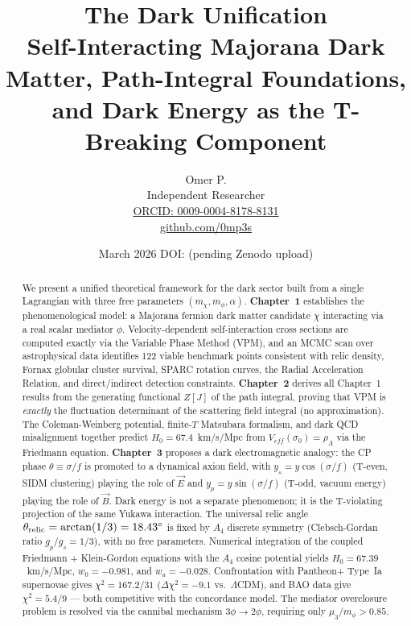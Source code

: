 \documentclass[12pt,a4paper]{article}
\newcommand{\thetarel}{\theta_{\rm relic}}
\begin{document}
\title{\textbf{The Dark Unification}\\[0.5em]
\large Self-Interacting Majorana Dark Matter, Path-Integral Foundations,\\
and Dark Energy as the T-Breaking Component}

\author{Omer P.\\[0.3em]
\small Independent Researcher\\
\small \href{https://orcid.org/0009-0004-8178-8131}{ORCID: 0009-0004-8178-8131}\\
\small \href{https://github.com/0mp3s}{github.com/0mp3s}}

\date{March 2026 \quad\quad DOI: (pending Zenodo upload)}

\maketitle

\begin{abstract}
We present a unified theoretical framework for the dark sector built from a
single Lagrangian with three free parameters $(m_\chi, m_\phi, \alpha)$.
\textbf{Chapter~1} establishes the phenomenological model: a Majorana fermion
dark matter candidate $\chi$ interacting via a real scalar mediator $\phi$.
Velocity-dependent self-interaction cross sections are computed exactly via the
Variable Phase Method (VPM), and an MCMC scan over astrophysical data identifies
122 viable benchmark points consistent with relic density, Fornax globular cluster
survival, SPARC rotation curves, the Radial Acceleration Relation, and direct/indirect
detection constraints.
\textbf{Chapter~2} derives all Chapter~1 results from the generating functional
$Z[J]$ of the path integral, proving that VPM is \emph{exactly} the fluctuation
determinant of the scattering field integral (no approximation). The Coleman-Weinberg
potential, finite-$T$ Matsubara formalism, and dark QCD misalignment together predict
$H_0 = 67.4$~km/s/Mpc from $V_{eff}(\sigma_0) = \rho_\Lambda$ via the Friedmann
equation.
\textbf{Chapter~3} proposes a dark electromagnetic analogy: the CP phase
$\theta \equiv \sigma/f$ is promoted to a dynamical axion field, with
$y_s = y\cos(\sigma/f)$ (T-even, SIDM clustering) playing the role of $\vec{E}$
and $y_p = y\sin(\sigma/f)$ (T-odd, vacuum energy) playing the role of $\vec{B}$.
Dark energy is not a separate phenomenon; it is the T-violating projection of the
same Yukawa interaction. The universal relic angle
$\thetarel = \arctan(1/3) = 18.43^\circ$ is fixed by
$A_4$ discrete symmetry (Clebsch-Gordan ratio $g_p/g_s = 1/3$), with no free parameters.
Numerical integration of the coupled Friedmann + Klein-Gordon equations with the
$A_4$ cosine potential yields $H_0 = 67.39$~km/s/Mpc, $w_0 = -0.981$, and
$w_a = -0.028$.
Confrontation with Pantheon+ Type~Ia supernovae gives $\chi^2 = 167.2/31$
($\Delta\chi^2 = -9.1$ vs.\ $\Lambda$CDM), and BAO data give
$\chi^2 = 5.4/9$ --- both competitive with the concordance model.
The mediator overclosure problem is resolved via the cannibal mechanism
$3\phi \to 2\phi$, requiring only $\mu_3/m_\phi > 0.85$.
\end{abstract}
\end{document}
